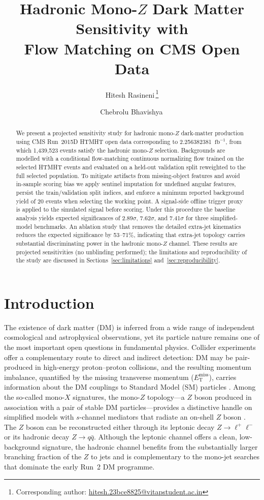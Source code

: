 \documentclass[11pt,a4paper,twocolumn]{article}
\title{%
  Hadronic Mono-\texorpdfstring{$Z$}{Z} Dark Matter Sensitivity with\\
  Flow Matching on CMS Open Data
}
\author[1,$\dagger$]{Hitesh Rasineni\,\orcidlink{0009-0003-4958-0915}\thanks{Corresponding author: \url{hitesh.23bce8825@vitapstudent.ac.in}}}
\author[2,$\dagger$]{Chebrolu Bhavishya\,\orcidlink{0009-0000-9770-0975}}
\affil[1]{VIT-AP University, Amaravati, 522241, India \\ \centerline{\small *hitesh.23bce8825@vitapstudent.ac.in}}
\affil[2]{Mohan Babu University, Tirupati, 517102, India \\ \centerline{\small 23102A041122@mbu.asia}}
\date{}
\newcommand{\MET}{\ensuremath{E_{\mathrm{T}}^{\mathrm{miss}}}}
\newcommand{\invfb}{\ensuremath{\mathrm{fb}^{-1}}}
\begin{document}
\maketitle

\begingroup
\renewcommand{\thefootnote}{\fnsymbol{footnote}}
\endgroup
\begin{abstract}
We present a projected sensitivity study for hadronic mono-$Z$ dark-matter
production using CMS Run~2015D HTMHT open data corresponding to
2.256382381~\invfb, from which 1{,}439{,}523 events satisfy the hadronic
mono-$Z$ selection. Backgrounds are modelled with a conditional flow-matching
continuous normalizing flow trained on the selected HTMHT events and
evaluated on a held-out validation split reweighted to the full selected
population. To mitigate artifacts from missing-object features and avoid
in-sample scoring bias we apply sentinel imputation for undefined angular
features, persist the train/validation split indices, and enforce a minimum
reported background yield of 20 events when selecting the working point. A
signal-side offline trigger proxy is applied to the simulated signal before
scoring. Under this procedure the baseline analysis yields expected
significances of 2.89$\sigma$, 7.62$\sigma$, and 7.41$\sigma$ for three
simplified-model benchmarks. An ablation study that removes the detailed
extra-jet kinematics reduces the expected significance by 53--71\%,
indicating that extra-jet topology carries substantial discriminating power
in the hadronic mono-$Z$ channel. These results are projected sensitivities
(no unblinding performed); the limitations and reproducibility of the study
are discussed in Sections~\ref{sec:limitations} and~\ref{sec:reproducibility}.
\end{abstract}
\section{Introduction}

The existence of dark matter (DM) is inferred from a wide range of
independent cosmological and astrophysical observations, yet its particle
nature remains one of the most important open questions in fundamental
physics. Collider experiments offer a complementary route to direct and
indirect detection: DM may be pair-produced in high-energy proton--proton
collisions, and the resulting momentum imbalance, quantified by the
missing transverse momentum (\MET), carries information about the DM
couplings to Standard Model (SM) particles \cite{abercrombie_dm_forum}.
Among the so-called mono-$X$ signatures, the mono-$Z$ topology---a $Z$
boson produced in association with a pair of stable DM particles---provides
a distinctive handle on simplified models with $s$-channel mediators that
radiate an on-shell $Z$ boson \cite{backovic_schannel,neubert_monoz}. The
$Z$ boson can be reconstructed either through its leptonic decay
$Z\to\ell^{+}\ell^{-}$ or its hadronic decay $Z\to q\bar{q}$. Although the
leptonic channel offers a clean, low-background signature, the hadronic
channel benefits from the substantially larger branching fraction of the
$Z$ to jets and is complementary to the mono-jet searches that dominate the
early Run~2 DM programme.
\end{document}
